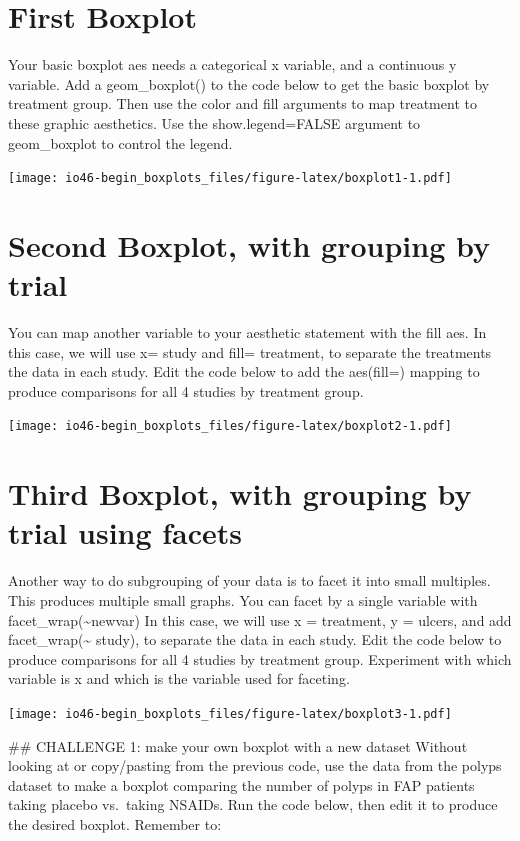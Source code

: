 \documentclass[
]{book}
\begin{document}
\hypertarget{first-boxplot}{%
\section{First Boxplot}\label{first-boxplot}}

Your basic boxplot aes needs a categorical x variable, and a continuous y variable.
Add a geom\_boxplot() to the code below to get the basic boxplot by treatment group.
Then use the color and fill arguments to map treatment to these graphic aesthetics. Use the show.legend=FALSE argument to geom\_boxplot to control the legend.

\texttt{[image: io46-begin\_boxplots\_files/figure-latex/boxplot1-1.pdf]}

\hypertarget{second-boxplot-with-grouping-by-trial}{%
\section{Second Boxplot, with grouping by trial}\label{second-boxplot-with-grouping-by-trial}}

You can map another variable to your aesthetic statement with the fill aes. In this case, we will use x= study and fill= treatment, to separate the treatments the data in each study. Edit the code below to add the aes(fill=) mapping to produce comparisons for all 4 studies by treatment group.

\texttt{[image: io46-begin\_boxplots\_files/figure-latex/boxplot2-1.pdf]}

\hypertarget{third-boxplot-with-grouping-by-trial-using-facets}{%
\section{Third Boxplot, with grouping by trial using facets}\label{third-boxplot-with-grouping-by-trial-using-facets}}

Another way to do subgrouping of your data is to facet it into small multiples. This produces multiple small graphs. You can facet by a single variable with facet\_wrap(\textasciitilde newvar) In this case, we will use x = treatment, y = ulcers, and add facet\_wrap(\textasciitilde{} study), to separate the data in each study. Edit the code below to produce comparisons for all 4 studies by treatment group. Experiment with which variable is x and which is the variable used for faceting.

\texttt{[image: io46-begin\_boxplots\_files/figure-latex/boxplot3-1.pdf]}

\#\# CHALLENGE 1: make your own boxplot with a new dataset
Without looking at or copy/pasting from the previous code,
use the data from the polyps dataset to make a boxplot comparing the number of polyps in FAP patients taking placebo vs.~taking NSAIDs.
Run the code below, then edit it to produce the desired boxplot.
Remember to:
\end{document}
